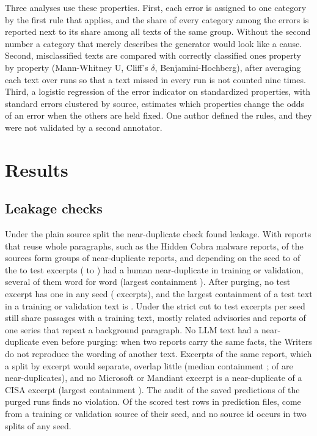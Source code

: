 \documentclass[journal]{IEEEtran}
\begin{document}
Three analyses use these properties. First, each error is assigned to one category by the first rule that applies,
and the share of every category among the errors is reported next to its share among all texts of the same group.
Without the second number a category that merely describes the generator would look like a cause. Second,
misclassified texts are compared with correctly classified ones property by property (Mann-Whitney U, Cliff's
$\delta$, Benjamini-Hochberg), after averaging each text over runs so that a text missed in every run is not counted
nine times. Third, a logistic regression of the error indicator on standardized properties, with standard errors
clustered by source, estimates which properties change the odds of an error when the others are held fixed. One
author defined the rules, and they were not validated by a second annotator.

\section{Results}\label{sec:results}



\subsection{Leakage checks}\label{sec:leakage}
Under the plain source split the near-duplicate check found leakage. With reports that reuse whole paragraphs, such
as the Hidden Cobra malware reports, \LeakDupSources{} of the \LeakNSources{} sources form \LeakDupGroups{} groups of
near-duplicate reports, and depending on the seed \LeakPlainChunksDupMin{} to \LeakPlainChunksDupMax{} of the
\LeakPlainTestChunksMin{} to \LeakPlainTestChunksMax{} test excerpts (\LeakPlainDupShareMin{} to
\LeakPlainDupShareMax{}) had a human near-duplicate in training or validation, several of them word for word (largest
containment \LeakPlainMaxContainment{}). After purging, no test excerpt has one in any seed
(\LeakPurgedChunksDupMax{} excerpts), and the largest containment of a test text in a training or validation text is
\LeakPurgedMaxContainment{}. Under the strict cut \LeakPurgedChunksStrictMin{} to \LeakPurgedChunksStrictMax{} test
excerpts per seed still share passages with a training text, mostly related advisories and reports of one series
that repeat a background paragraph. No LLM text had a near-duplicate even before purging: when two reports carry the same facts, the Writers
do not reproduce the wording of another text. Excerpts of the same report, which a split by excerpt would separate,
overlap little (median containment \LeakSiblingMedian{}; \LeakSiblingDup{} of \LeakNSiblings{} are near-duplicates),
and no Microsoft or Mandiant excerpt is a near-duplicate of a CISA excerpt (largest containment \LeakVendorMax{}).
The audit of the saved predictions of the purged runs finds no violation. Of the \LeakAuditRows{} scored test rows
in \LeakAuditFiles{} prediction files, \LeakAuditBad{} come from a training or validation source of their seed, and
no source id occurs in two splits of any seed.
\end{document}
